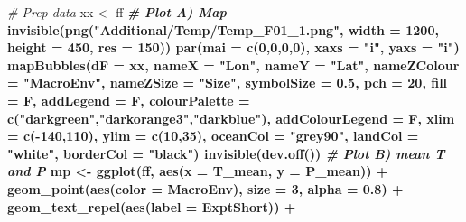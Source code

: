 \documentclass[
]{article}
\newenvironment{Shaded}{\begin{snugshade}}{\end{snugshade}}
\newcommand{\CommentTok}[1]{\textcolor[rgb]{0.56,0.35,0.01}{\textit{#1}}}
\newcommand{\DataTypeTok}[1]{\textcolor[rgb]{0.13,0.29,0.53}{#1}}
\newcommand{\DecValTok}[1]{\textcolor[rgb]{0.00,0.00,0.81}{#1}}
\newcommand{\FloatTok}[1]{\textcolor[rgb]{0.00,0.00,0.81}{#1}}
\newcommand{\KeywordTok}[1]{\textcolor[rgb]{0.13,0.29,0.53}{\textbf{#1}}}
\newcommand{\NormalTok}[1]{#1}
\newcommand{\OperatorTok}[1]{\textcolor[rgb]{0.81,0.36,0.00}{\textbf{#1}}}
\newcommand{\StringTok}[1]{\textcolor[rgb]{0.31,0.60,0.02}{#1}}
\begin{document}
\begin{Shaded}
\begin{Highlighting}[]
\CommentTok{# Prep data}
\NormalTok{xx <-}\StringTok{ }\NormalTok{ff }\OperatorTok{%
\CommentTok{# Plot A) Map}
\KeywordTok{invisible}\NormalTok{(}\KeywordTok{png}\NormalTok{(}\StringTok{"Additional/Temp/Temp_F01_1.png"}\NormalTok{, }\DataTypeTok{width =} \DecValTok{1200}\NormalTok{, }\DataTypeTok{height =} \DecValTok{450}\NormalTok{, }\DataTypeTok{res =} \DecValTok{150}\NormalTok{))}
\KeywordTok{par}\NormalTok{(}\DataTypeTok{mai =} \KeywordTok{c}\NormalTok{(}\DecValTok{0}\NormalTok{,}\DecValTok{0}\NormalTok{,}\DecValTok{0}\NormalTok{,}\DecValTok{0}\NormalTok{), }\DataTypeTok{xaxs =} \StringTok{"i"}\NormalTok{, }\DataTypeTok{yaxs =} \StringTok{"i"}\NormalTok{)}
\KeywordTok{mapBubbles}\NormalTok{(}\DataTypeTok{dF =}\NormalTok{ xx, }\DataTypeTok{nameX =} \StringTok{"Lon"}\NormalTok{, }\DataTypeTok{nameY =} \StringTok{"Lat"}\NormalTok{, }\DataTypeTok{nameZColour =} \StringTok{"MacroEnv"}\NormalTok{,}
           \DataTypeTok{nameZSize =} \StringTok{"Size"}\NormalTok{, }\DataTypeTok{symbolSize =} \FloatTok{0.5}\NormalTok{, }\DataTypeTok{pch =} \DecValTok{20}\NormalTok{, }\DataTypeTok{fill =}\NormalTok{ F, }\DataTypeTok{addLegend =}\NormalTok{ F,}
           \DataTypeTok{colourPalette =} \KeywordTok{c}\NormalTok{(}\StringTok{"darkgreen"}\NormalTok{,}\StringTok{"darkorange3"}\NormalTok{,}\StringTok{"darkblue"}\NormalTok{), }\DataTypeTok{addColourLegend =}\NormalTok{ F, }
           \DataTypeTok{xlim =} \KeywordTok{c}\NormalTok{(}\OperatorTok{-}\DecValTok{140}\NormalTok{,}\DecValTok{110}\NormalTok{), }\DataTypeTok{ylim =} \KeywordTok{c}\NormalTok{(}\DecValTok{10}\NormalTok{,}\DecValTok{35}\NormalTok{),  }
           \DataTypeTok{oceanCol =} \StringTok{"grey90"}\NormalTok{, }\DataTypeTok{landCol =} \StringTok{"white"}\NormalTok{, }\DataTypeTok{borderCol =} \StringTok{"black"}\NormalTok{)}
\KeywordTok{invisible}\NormalTok{(}\KeywordTok{dev.off}\NormalTok{())}
\CommentTok{# Plot B) mean T and P}
\NormalTok{mp <-}\StringTok{ }\KeywordTok{ggplot}\NormalTok{(ff, }\KeywordTok{aes}\NormalTok{(}\DataTypeTok{x =}\NormalTok{ T_mean, }\DataTypeTok{y =}\NormalTok{ P_mean)) }\OperatorTok{+}\StringTok{ }
\StringTok{  }\KeywordTok{geom_point}\NormalTok{(}\KeywordTok{aes}\NormalTok{(}\DataTypeTok{color =}\NormalTok{ MacroEnv), }\DataTypeTok{size =} \DecValTok{3}\NormalTok{, }\DataTypeTok{alpha =} \FloatTok{0.8}\NormalTok{) }\OperatorTok{+}\StringTok{ }
\StringTok{  }\KeywordTok{geom_text_repel}\NormalTok{(}\KeywordTok{aes}\NormalTok{(}\DataTypeTok{label =}\NormalTok{ ExptShort)) }\OperatorTok{+}\StringTok{ }
}
\end{Highlighting}
\end{Shaded}
\end{document}
